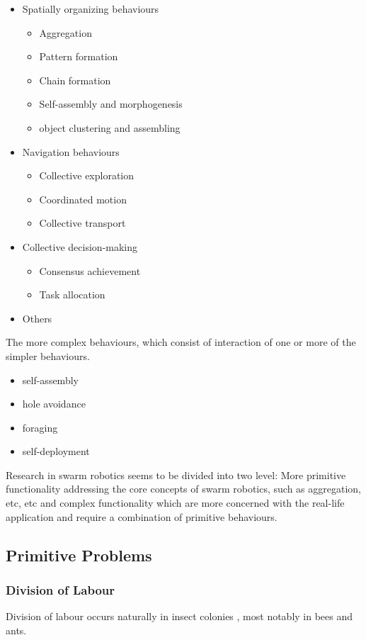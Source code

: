 \begin{itemize}
	\item Spatially organizing behaviours
		\begin{itemize}
			\item Aggregation
			\item Pattern formation
			\item Chain formation
			\item Self-assembly and morphogenesis
			\item object clustering and assembling
		\end{itemize}
	\item Navigation behaviours
		\begin{itemize}
			\item Collective exploration
			\item Coordinated motion
			\item Collective transport
		\end{itemize}
	\item Collective decision-making
		\begin{itemize}
			\item Consensus achievement
			\item Task allocation
		\end{itemize}
	\item Others
\end{itemize}

The more complex behaviours, which consist of interaction of one or more of the simpler behaviours. 

\begin{itemize}
	\item self-assembly
	\item hole avoidance
	\item foraging
	\item self-deployment
\end{itemize}

Research in swarm robotics seems to be divided into two level: More primitive functionality addressing the core concepts of swarm robotics, such as aggregation, etc, etc and complex functionality which are more concerned with the real-life application and require a combination of primitive behaviours.

\subsection{Primitive Problems}

\subsubsection{Division of Labour}
Division of labour occurs naturally in insect colonies \cite{gautrais2002emergent}, most notably in bees and ants.

